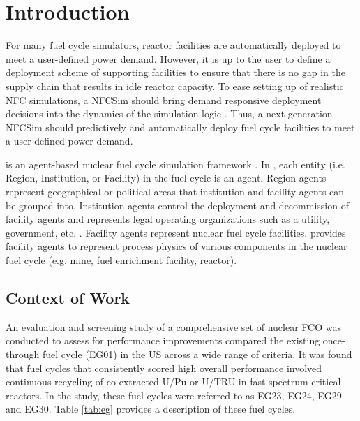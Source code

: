 \section{Introduction}
For many fuel cycle simulators, reactor facilities are automatically 
deployed to meet a user-defined power demand. 
However, it is up to the user to define a deployment scheme of 
supporting facilities to ensure that there is no gap in the supply 
chain that results in idle reactor capacity. 
To ease setting up of realistic \gls{NFC} simulations, a \gls{NFCSim}
should bring demand responsive deployment decisions into 
the dynamics of the simulation logic \cite{huff_current_2017}. 
Thus, a next generation \gls{NFCSim} should predictively and 
automatically deploy fuel cycle facilities to meet a user defined 
power demand. 

\Cyclus is an agent-based nuclear fuel cycle simulation framework 
\cite{huff_fundamental_2016}. 
In \Cyclus, each entity (i.e. Region, Institution, or Facility) in the 
fuel cycle is an agent. 
Region agents represent geographical or political areas that institution
and facility agents can be grouped into. 
Institution agents control the 
deployment and decommission of facility agents 
and represents legal operating organizations such as a 
utility, government, etc. \cite{huff_fundamental_2016}. 
Facility agents represent nuclear fuel cycle facilities. 
\Cycamore \cite{carlsen_cycamore_2014}
provides facility agents to represent process physics of various 
components in the nuclear fuel cycle (e.g. mine, fuel enrichment 
facility, reactor). 

\subsection{Context of Work}
An evaluation and screening study of a comprehensive set of nuclear 
\gls{FCO} \cite{wigeland_nuclear_2014} was conducted to assess 
for performance improvements compared the existing once-through 
fuel cycle (EG01) in the \gls{US} across a wide range of criteria. 
It was found that fuel cycles that consistently scored high 
overall performance involved continuous recycling
of co-extracted U/Pu or U/TRU in fast spectrum critical reactors. 
In the study, these fuel cycles were referred to as EG23, EG24, 
EG29 and EG30. 
Table \ref{tab:eg} provides a description of these fuel cycles. 

